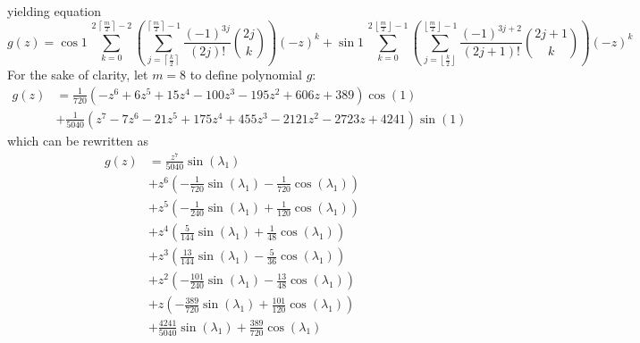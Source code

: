 yielding equation
\begin{equation}
  g(z) = \cos{1}\,\sum_{k=0}^{2\,\left\lceil \frac{m}{2} \right\rceil-2}{\left(\sum_{j=\left\lceil \frac{k}{2}\right\rceil}^{\left\lceil \frac{m}{2} \right\rceil -1}{\frac{(-1)^{3j}}{(2j)!}{2j\choose k}}\right) {(-z)^{k}}}
       + \sin{1}\,\sum_{k=0}^{2\,\left\lfloor \frac{m}{2} \right\rfloor-1}{\left(\sum_{j=\left\lfloor \frac{k}{2}\right\rfloor}^{\left\lfloor \frac{m}{2} \right\rfloor -1}{\frac{(-1)^{3j+2}}{(2j + 1)!} {2j+1\choose k}}\right){(-z)^{k}}}
\end{equation}
For the sake of clarity, let $m=8$ to define polynomial $g$:
\begin{displaymath}
\begin{split}
g{\left (z \right )} &= \frac{1}{720} \left(- z^{6} + 6 z^{5} + 15 z^{4} - 100 z^{3} - 195 z^{2} + 606 z + 389\right) \cos{\left (1 \right )} \\
                     &+ \frac{1}{5040} \left(z^{7} - 7 z^{6} - 21 z^{5} + 175 z^{4} + 455 z^{3} - 2121 z^{2} - 2723 z + 4241\right) \sin{\left (1 \right )}
\end{split}
\end{displaymath}
which can be rewritten as
\begin{displaymath}
\begin{split}
g{\left (z \right )} &= \frac{z^{7}}{5040} \sin{\left (\lambda_{1} \right )} \\
                     &+ z^{6} \left(- \frac{1}{720} \sin{\left (\lambda_{1} \right )} - \frac{1}{720} \cos{\left (\lambda_{1} \right )}\right) \\
                     &+ z^{5} \left(- \frac{1}{240} \sin{\left (\lambda_{1} \right )} + \frac{1}{120} \cos{\left (\lambda_{1} \right )}\right) \\
                     &+ z^{4} \left(\frac{5}{144} \sin{\left (\lambda_{1} \right )} + \frac{1}{48} \cos{\left (\lambda_{1} \right )}\right) \\
                     &+ z^{3} \left(\frac{13}{144} \sin{\left (\lambda_{1} \right )} - \frac{5}{36} \cos{\left (\lambda_{1} \right )}\right) \\
                     &+ z^{2} \left(- \frac{101}{240} \sin{\left (\lambda_{1} \right )} - \frac{13}{48} \cos{\left (\lambda_{1} \right )}\right) \\
                     &+ z \left(- \frac{389}{720} \sin{\left (\lambda_{1} \right )} + \frac{101}{120} \cos{\left (\lambda_{1} \right )}\right) \\
                     &+ \frac{4241}{5040} \sin{\left (\lambda_{1} \right )} + \frac{389}{720} \cos{\left (\lambda_{1} \right )} \\
\end{split}
\end{displaymath}

